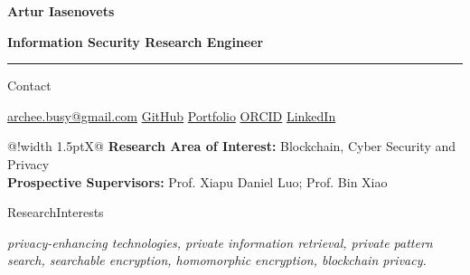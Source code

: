 \documentclass[11pt,a4paper]{article}
\newcommand{\cvrow}[2]{%
  \noindent
  \begin{minipage}[t]{0.145\textwidth}
    \vspace{0pt}%
    \raggedright
    \fontsize{10.5}{12.5}\selectfont
    #1
  \end{minipage}%
  \hfill
  \begin{minipage}[t]{0.835\textwidth}
    \vspace{0pt}%
    #2
  \end{minipage}\par
}
\begin{document}
{\fontsize{24}{28}\selectfont\bfseries Artur Iasenovets}\par
\vspace{0.08em}
{\large\bfseries Information Security Research Engineer}\par
\vspace{0.22em}
\hrule
\vspace{0.55em}

\cvrow{Contact}{%
  \href{mailto:archee.busy@gmail.com}{archee.busy@gmail.com}
  \;\textbullet\;
  \href{https://github.com/iasenovets}{GitHub}
  \;\textbullet\;
  \href{https://iasenovets.github.io/}{Portfolio}
  \;\textbullet\;
  \href{https://orcid.org/0009-0008-0008-3746}{ORCID}
  \;\textbullet\;
  \href{https://linkedin.com/in/iasenovets}{LinkedIn}
}

\vspace{0.55em}

\noindent\hfill
\begin{minipage}[t]{0.835\textwidth}
  \vspace{0pt}%
  \begin{tabularx}{\linewidth}
    {@{}!{\color{linkblue}\vrule width 1.5pt\hspace{0.70em}}X@{}}
    \textbf{Research Area of Interest:} Blockchain, Cyber Security and Privacy\\[0.18em]
    \textbf{Prospective Supervisors:} Prof. Xiapu Daniel Luo; Prof. Bin Xiao
  \end{tabularx}
\end{minipage}\par

\vspace{0.55em}

\cvrow{Research\newline Interests}{%
  \textit{privacy-enhancing technologies, private information retrieval, private pattern search,
  searchable encryption, homomorphic encryption, blockchain privacy.}
}

\vspace{0.75em}
\end{document}
